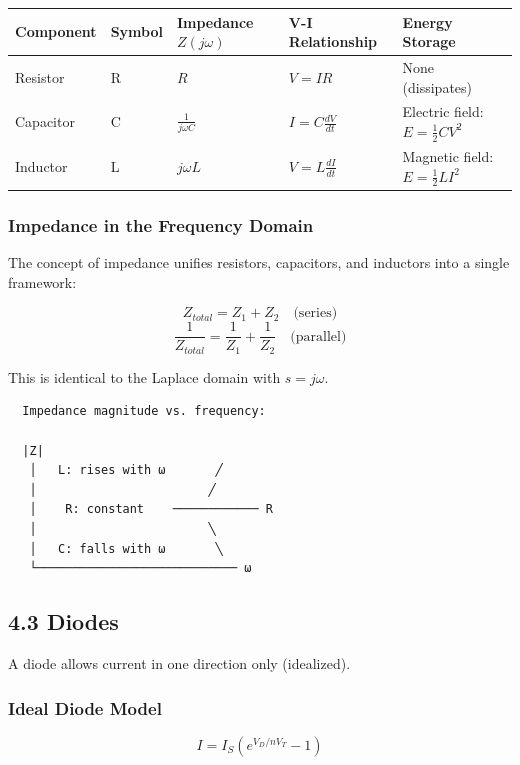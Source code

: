 \documentclass[11pt,a4paper]{book}
\begin{document}
\begin{center}
\begin{tabular}{|l|l|l|l|l|}
\hline
Component & Symbol & Impedance $Z(j\omega)$ & V-I Relationship & Energy Storage \\
\hline
Resistor & R & $R$ & $V = IR$ & None (dissipates) \\
Capacitor & C & $\frac{1}{j\omega C}$ & $I = C\frac{dV}{dt}$ & Electric field: $E = \frac{1}{2}CV^2$ \\
Inductor & L & $j\omega L$ & $V = L\frac{dI}{dt}$ & Magnetic field: $E = \frac{1}{2}LI^2$ \\
\hline
\end{tabular}
\end{center}

\subsubsection{Impedance in the Frequency Domain}

The concept of impedance unifies resistors, capacitors, and inductors into a single framework:

\[Z_{total} = Z_1 + Z_2 \quad \text{(series)}\]
\[\frac{1}{Z_{total}} = \frac{1}{Z_1} + \frac{1}{Z_2} \quad \text{(parallel)}\]

This is identical to the Laplace domain with $s = j\omega$.

\begin{lstlisting}
  Impedance magnitude vs. frequency:
  
  |Z|
   │   L: rises with ω       ╱
   │                        ╱
   │    R: constant    ──────────── R
   │                        ╲
   │   C: falls with ω       ╲
   └──────────────────────────── ω
\end{lstlisting}

\medskip\noindent\hrulefill\medskip

\subsection{4.3 Diodes}

A diode allows current in one direction only (idealized).

\subsubsection{Ideal Diode Model}

\[I = I_S\left(e^{V_D / nV_T} - 1\right)\]
\end{document}
